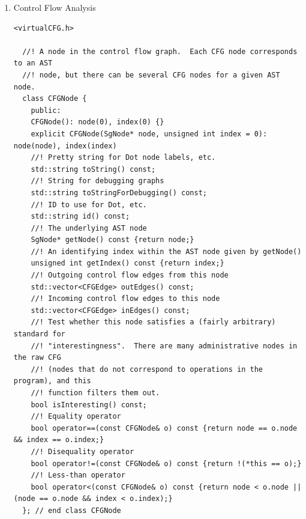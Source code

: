 \begin{enumerate}
\begin{enumerate}
\begin{lstlisting}
      \end{lstlisting}

      \item Control Flow Analysis
      \begin{lstlisting}
<virtualCFG.h> 

  //! A node in the control flow graph.  Each CFG node corresponds to an AST
  //! node, but there can be several CFG nodes for a given AST node.  
  class CFGNode {
    public:
    CFGNode(): node(0), index(0) {}
    explicit CFGNode(SgNode* node, unsigned int index = 0): node(node), index(index)
    //! Pretty string for Dot node labels, etc.
    std::string toString() const;
    //! String for debugging graphs
    std::string toStringForDebugging() const;
    //! ID to use for Dot, etc.
    std::string id() const;
    //! The underlying AST node
    SgNode* getNode() const {return node;}
    //! An identifying index within the AST node given by getNode()
    unsigned int getIndex() const {return index;}
    //! Outgoing control flow edges from this node
    std::vector<CFGEdge> outEdges() const;
    //! Incoming control flow edges to this node
    std::vector<CFGEdge> inEdges() const;
    //! Test whether this node satisfies a (fairly arbitrary) standard for
    //! "interestingness".  There are many administrative nodes in the raw CFG
    //! (nodes that do not correspond to operations in the program), and this
    //! function filters them out.
    bool isInteresting() const;
    //! Equality operator
    bool operator==(const CFGNode& o) const {return node == o.node && index == o.index;}
    //! Disequality operator
    bool operator!=(const CFGNode& o) const {return !(*this == o);}
    //! Less-than operator
    bool operator<(const CFGNode& o) const {return node < o.node || (node == o.node && index < o.index);}
  }; // end class CFGNode


\end{lstlisting}
\end{enumerate}
\end{enumerate}
